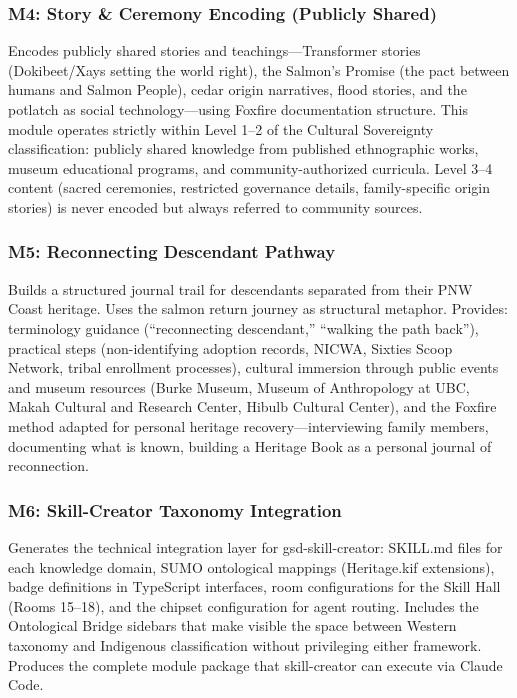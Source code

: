 \documentclass[11pt,letterpaper]{article}
\begin{document}
\subsubsection{M4: Story \& Ceremony Encoding (Publicly Shared)}
Encodes publicly shared stories and teachings---Transformer stories (Dokibeet/Xays setting the world right), the Salmon's Promise (the pact between humans and Salmon People), cedar origin narratives, flood stories, and the potlatch as social technology---using Foxfire documentation structure. This module operates strictly within Level 1--2 of the Cultural Sovereignty classification: publicly shared knowledge from published ethnographic works, museum educational programs, and community-authorized curricula. Level 3--4 content (sacred ceremonies, restricted governance details, family-specific origin stories) is never encoded but always referred to community sources.

\subsubsection{M5: Reconnecting Descendant Pathway}
Builds a structured journal trail for descendants separated from their PNW Coast heritage. Uses the salmon return journey as structural metaphor. Provides: terminology guidance (``reconnecting descendant,'' ``walking the path back''), practical steps (non-identifying adoption records, NICWA, Sixties Scoop Network, tribal enrollment processes), cultural immersion through public events and museum resources (Burke Museum, Museum of Anthropology at UBC, Makah Cultural and Research Center, Hibulb Cultural Center), and the Foxfire method adapted for personal heritage recovery---interviewing family members, documenting what is known, building a Heritage Book as a personal journal of reconnection.

\subsubsection{M6: Skill-Creator Taxonomy Integration}
Generates the technical integration layer for gsd-skill-creator: SKILL.md files for each knowledge domain, SUMO ontological mappings (Heritage.kif extensions), badge definitions in TypeScript interfaces, room configurations for the Skill Hall (Rooms 15--18), and the chipset configuration for agent routing. Includes the Ontological Bridge sidebars that make visible the space between Western taxonomy and Indigenous classification without privileging either framework. Produces the complete module package that skill-creator can execute via Claude Code.
\end{document}
